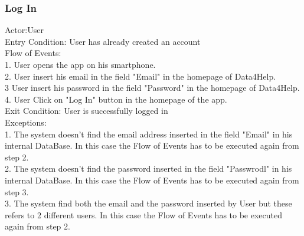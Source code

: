 \subsubsection{Log In}
Actor:User\\
Entry Condition: User has already created an account\\
Flow of Events:\\
1. User opens the app on his smartphone.\\
2. User insert his email in the field "Email" in the homepage of Data4Help.\\
3  User insert his password in the field "Password" in the homepage of Data4Help.\\
4. User Click on "Log In" button in the homepage of the app.\\
Exit Condition: User is successfully logged in\\
Exceptions:\\
1. The system doesn't find the email address inserted in the field "Email" in his internal DataBase. In this case the Flow of Events has to be executed again from step 2. \\
2. The system doesn't find the password inserted in the field "Passwrodl" in his internal DataBase. In this case the Flow of Events has to be executed again from step 3. \\
3. The system find both the email and the password inserted by User but these refers to 2 different users. In this case the Flow of Events has to be executed again from step 2. \\

